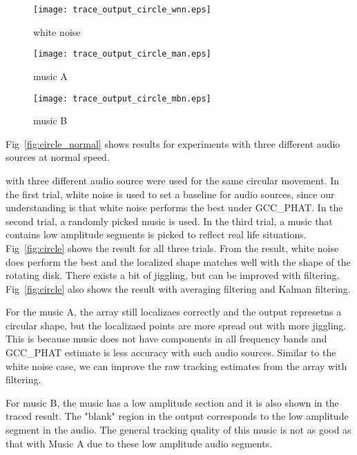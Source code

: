 \begin{figure*}[]
\centering
\begin{subfigure}[]{1.0\textwidth}
  \texttt{[image: trace\_output\_circle\_wnn.eps]}
  \caption{white noise}
  \label{fig:circle_wn}
\end{subfigure}
\begin{subfigure}[]{1.0\textwidth}
  \texttt{[image: trace\_output\_circle\_man.eps]}
  \caption{music A}
  \label{fig:circle_musica}
\end{subfigure}
\begin{subfigure}[]{1.0\textwidth}
  \texttt{[image: trace\_output\_circle\_mbn.eps]}
  \caption{music B}
  \label{fig:circle_musicb}
\end{subfigure}
\caption{Localization of circle movement with different sound sources. Sound source is moving at $10$ cm per second}
\label{fig:circle_normal}
\end{figure*}


Fig~\ref{fig:circle_normal} shows results for experiments with three different audio sources at normal speed.

with three different audio source were used for the same circular movement. In the first trial, white noise is used to set a baseline for audio sources, since our understanding is that white noise performs the best under GCC\_PHAT. In the second trial, a randomly picked music is used. In the third trial, a music that contains low amplitude segments is picked to reflect real life situations. Fig~\ref{fig:circle} shows the result for all three trials. From the result, white noise does perform the best and the localized shape matches well with the shape of the rotating disk. There exists a bit of jiggling, but can be improved with filtering. Fig~\ref{fig:circle} also shows the result with averaging filtering and Kalman filtering. 

For the music A, the array still localizaes correctly and the output represetns a circular shape, but the localizaed points are more spread out with more jiggling. This is because music does not have components in all frequency bands and GCC\_PHAT estimate is less accuracy with such audio sources. Similar to the white noise case, we can improve the raw tracking estimates from the array with filtering.

For music B, the music has a low amplitude section and it is also shown in the traced result. The "blank" region in the output corresponds to the low amplitude segment in the audio. The general tracking quality of this music is not as good as that with Music A due to these low amplitude audio segments. 


